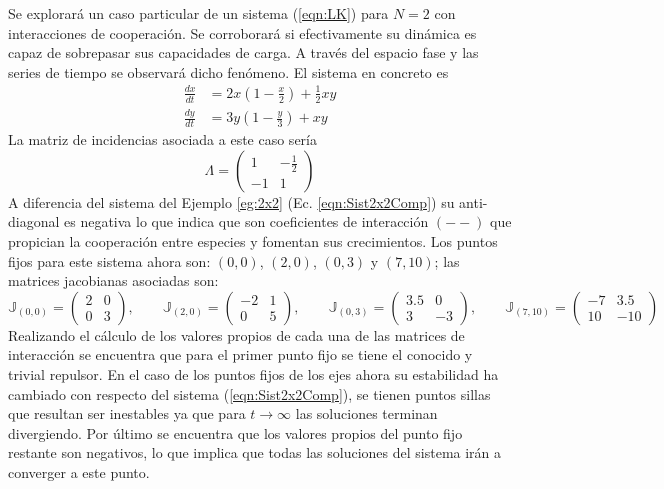 \begin{ejemplo}\label{eg:2x2CoopyDemás}
	Se explorará un caso particular de un sistema (\ref{eqn:LK}) para $N=2$ con interacciones de cooperación. Se corroborará si efectivamente su dinámica es capaz de sobrepasar sus capacidades de carga. A través del espacio fase y las series de tiempo se observará dicho fenómeno. El sistema en concreto es
	\begin{equation}\label{eqn:Sist2x2Coop}
		\begin{split}
			\frac{dx}{dt} &= 2x\left (1-\frac{x}{2}\right )+\frac{1}{2}xy\\
			\frac{dy}{dt} &= 3y\left (1-\frac{y}{3}\right )+xy
		\end{split}
	\end{equation}
	La matriz de incidencias asociada a este caso sería 
	$$
	\Lambda = \begin{pmatrix}
		1 & -\frac{1}{2}\\
		-1 & 1
	\end{pmatrix}
	$$
	A diferencia del sistema del Ejemplo \ref{eg:2x2} (Ec. \ref{eqn:Sist2x2Comp}) su anti-diagonal es negativa lo que indica que son coeficientes de interacción $(--)$ que propician la cooperación entre especies y fomentan sus crecimientos. Los puntos fijos para este sistema ahora son: $(0,0)$, $(2,0)$, $(0,3)$ y $(7,10)$; las matrices jacobianas asociadas son:
	$$
	\mathbb{J}_{(0,0)}=\begin{pmatrix}
		2 & 0 \\
		0 & 3
	\end{pmatrix},\qquad\mathbb{J}_{(2,0)}=\begin{pmatrix}
	-2 & 1\\
	0 & 5
	\end{pmatrix},\qquad\mathbb{J}_{(0,3)}=\begin{pmatrix}
	3.5 & 0 \\
	3 & -3
	\end{pmatrix},\qquad\mathbb{J}_{(7,10)}=\begin{pmatrix}
	-7 & 3.5\\
	10 & -10
	\end{pmatrix}
	$$
	Realizando el cálculo de los valores propios de cada una de las matrices de interacción se encuentra que para el primer punto fijo se tiene el conocido y trivial repulsor. En el caso de los puntos fijos de los ejes ahora su estabilidad ha cambiado con respecto del sistema (\ref{eqn:Sist2x2Comp}), se tienen puntos sillas que resultan ser inestables ya que para $t\to\infty$ las soluciones terminan divergiendo. Por último se encuentra que los valores propios del punto fijo restante son negativos, lo que implica que todas las soluciones del sistema irán a converger a este punto.

\end{ejemplo}
